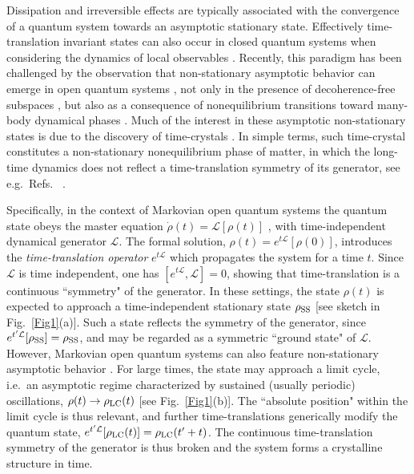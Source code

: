 \documentclass[prl,superscriptaddress,showpacs,longbibliography,reprint]{revtex4-2}
\begin{document}
 Dissipation and irreversible effects are typically associated with the convergence of a quantum system towards an asymptotic stationary state. Effectively time-translation invariant states can also occur in closed quantum systems when considering the dynamics of local observables \cite{rigol2008,polkovnikov2011,dalessio2016}. Recently, this paradigm has been challenged by the observation that non-stationary asymptotic behavior can emerge in open quantum systems \cite{buca2019}, not only in the presence of decoherence-free subspaces \cite{lidar1998,knill2000,lidar2003,blume2008}, but also as a consequence of nonequilibrium transitions toward many-body dynamical phases \cite{iemini2018,iemini2021}. Much of the interest in these asymptotic non-stationary states is due to the discovery of time-crystals \cite{wilczek2012,shapere2012}. In simple terms, such time-crystal constitutes a non-stationary nonequilibrium phase of matter, in which the long-time dynamics does not reflect a time-translation symmetry of its generator, see e.g.~Refs.~ \cite{wilczek2012,shapere2012,li2012,else2016,khemani2016,choi2017,zhang2017,sacha2017,lazarides2017,gong2018,gambetta2019,zhu2019,dogra2019,buca2019b,chiacchio2019,yao2020,hurtado2020,nicolaou2021,pizzi2021,kessler2021,iemini2018,buca2019,carollo2020,iemini2021,buonaiuto2021,piccitto2021}.

Specifically, in the context of Markovian open quantum systems the quantum state obeys the master equation $\dot{\rho}(t)=\mathcal{L}[\rho(t)]$ \cite{lindblad1976,gorini1976,breuer2002,gardiner2004,alicki2007}, with time-independent dynamical generator $\mathcal{L}$. The formal solution,  $\rho(t)=e^{t\mathcal{L}}[\rho(0)]$, introduces the {\it time-translation operator} $e^{t\mathcal{L}}$ which propagates the system for a time $t$. 
Since $\mathcal{L}$ is time independent, one has $[e^{t\mathcal{L}},\mathcal{L}]=0$, showing that time-translation is a continuous ``symmetry" of the generator. 
In these settings, the state $\rho(t)$ is expected to approach a time-independent stationary state $\rho_{\rm SS}$ [see sketch in Fig.~\ref{Fig1}(a)]. 
Such a state reflects the symmetry of the generator, since $e^{t'\mathcal{L}}[\rho_{\rm SS}]=\rho_{\rm SS}$, and may be regarded as a symmetric ``ground state" of $\mathcal{L}$. However, Markovian open quantum systems can also feature non-stationary asymptotic behavior \cite{buca2019}. For large times, the state may approach a limit cycle, i.e.~an asymptotic regime characterized by sustained (usually periodic) oscillations, $\rho(t)\rightarrow \rho_{\rm LC}(t)$ [see Fig.~\ref{Fig1}(b)]. The ``absolute position" within the limit cycle is thus relevant, and further time-translations generically modify the quantum state, $e^{t'\mathcal{L}}[\rho_{\rm LC}(t)]=\rho_{\rm LC}(t'+t)$. The continuous time-translation symmetry of the generator is thus broken and the system forms a crystalline structure in time.
\end{document}
